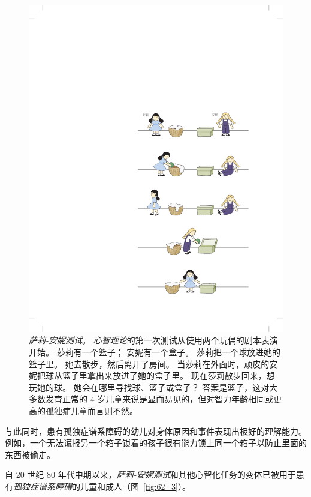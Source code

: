 \begin{figure}[htbp]
	\centering
	\includegraphics[width=0.7\linewidth]{chap62/fig_62_2}
	\caption{\textit{萨莉-安妮测试}。
		\textit{心智理论}的第一次测试从使用两个玩偶的剧本表演开始。
		莎莉有一个篮子；
		安妮有一个盒子。
		莎莉把一个球放进她的篮子里。
		她去散步，然后离开了房间。
		当莎莉在外面时，顽皮的安妮把球从篮子里拿出来放进了她的盒子里。
		现在莎莉散步回来，想玩她的球。
		她会在哪里寻找球、篮子或盒子？
		答案是篮子，这对大多数发育正常的 4 岁儿童来说是显而易见的，但对智力年龄相同或更高的孤独症儿童而言则不然。}
	\label{fig:62_2}
\end{figure}


与此同时，患有孤独症谱系障碍的幼儿对身体原因和事件表现出极好的理解能力。
例如，一个无法谎报另一个箱子锁着的孩子很有能力锁上同一个箱子以防止里面的东西被偷走。


自 20 世纪 80 年代中期以来，\textit{萨莉-安妮测试}和其他心智化任务的变体已被用于患有\textit{孤独症谱系障碍}的儿童和成人（图~\ref{fig:62_3}）。


